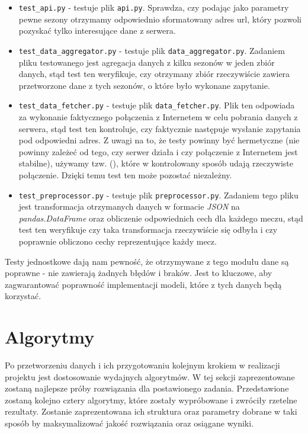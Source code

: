         \begin{itemize}
            \item \texttt{test\_api.py} - testuje plik \texttt{api.py}. Sprawdza, czy podając jako parametry pewne sezony otrzymamy odpowiednio sformatowany adres url, który pozwoli pozyskać tylko interesujące dane z serwera.
            \item \texttt{test\_data\_aggregator.py} - testuje plik \texttt{data\_aggregator.py}. Zadaniem pliku testowanego jest agregacja danych z kilku sezonów w jeden zbiór danych, stąd test ten weryfikuje, czy otrzymany zbiór rzeczywiście zawiera przetworzone dane z tych sezonów, o które było wykonane zapytanie.
            \item \texttt{test\_data\_fetcher.py} - testuje plik \texttt{data\_fetcher.py}. Plik ten odpowiada za wykonanie faktycznego połączenia z Internetem w celu pobrania danych z serwera, stąd test ten kontroluje, czy faktycznie następuje wysłanie zapytania pod odpowiedni adres. Z uwagi na to, że testy powinny być hermetyczne (nie powinny zależeć od tego, czy serwer działa i czy połączenie z Internetem jest stabilne), używamy tzw.  (), które w kontrolowany sposób udają rzeczywiste połączenie. Dzięki temu test ten może pozostać niezależny.
            \item \texttt{test\_preprocessor.py} - testuje plik \texttt{preprocessor.py}. Zadaniem tego pliku jest transformacja otrzymanych danych w formacie \emph{JSON} na \emph{pandas.DataFrame} oraz obliczenie odpowiednich cech dla każdego meczu, stąd test ten weryfikuje czy taka transformacja rzeczywiście się odbyła i czy poprawnie obliczono cechy reprezentujące każdy mecz.
        \end{itemize}
        
        Testy jednostkowe dają nam pewność, że otrzymywane z tego modułu dane są poprawne - nie zawierają żadnych błędów i braków. Jest to kluczowe, aby zagwarantować poprawność implementacji modeli, które z tych danych będą korzystać.
        
    \section{Algorytmy}
    Po przetworzeniu danych i ich przygotowaniu kolejnym krokiem w realizacji projektu jest dostosowanie wydajnych algorytmów. W tej sekcji zaprezentowane zostaną najlepsze próby rozwiązania dla postawionego zadania. Przedstawione zostaną kolejno cztery algorytmy, które zostały wypróbowane i zwróciły rzetelne rezultaty. Zostanie zaprezentowana ich struktura oraz parametry dobrane w taki sposób by maksymalizować jakość rozwiązania oraz osiągane wyniki.
